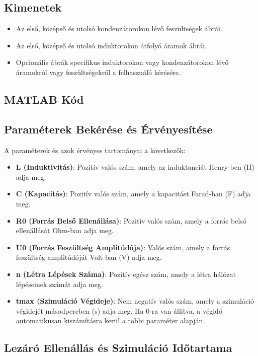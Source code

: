 \documentclass[12pt,a4paper]{article}
\begin{document}
\subsection*{Kimenetek}

\begin{itemize}
    \item Az első, középső és utolsó kondenzátorokon lévő feszültségek ábrái.
    \item Az első, középső és utolsó induktorokon átfolyó áramok ábrái.
    \item Opcionális ábrák specifikus induktorokon vagy kondenzátorokon lévő áramokról vagy feszültségekről a felhasználó kérésére.
\end{itemize}

\subsection*{MATLAB Kód}
\subsection*{Paraméterek Bekérése és Érvényesítése}

A paraméterek és azok érvényes tartományai a következők:

\begin{itemize}
    \item \textbf{L (Induktivitás)}: Pozitív valós szám, amely az induktanciát Henry-ben (H) adja meg.
    \item \textbf{C (Kapacitás)}: Pozitív valós szám, amely a kapacitást Farad-ban (F) adja meg.
    \item \textbf{R0 (Forrás Belső Ellenállása)}: Pozitív valós szám, amely a forrás belső ellenállását Ohm-ban adja meg.
    \item \textbf{U0 (Forrás Feszültség Amplitúdója)}: Valós szám, amely a forrás feszültség amplitúdóját Volt-ban (V) adja meg.
    \item \textbf{n (Létra Lépések Száma)}: Pozitív egész szám, amely a létra hálózat lépéseinek számát adja meg.
    \item \textbf{tmax (Szimuláció Végideje)}: Nem negatív valós szám, amely a szimuláció végidejét másodpercben (s) adja meg. Ha 0-ra van állítva, a végidő automatikusan kiszámításra kerül a többi paraméter alapján.
\end{itemize}

\subsection*{Lezáró Ellenállás és Szimuláció Időtartama}
\end{document}
